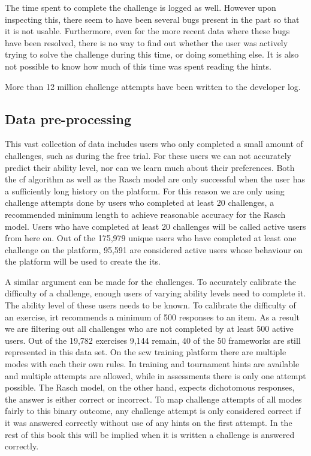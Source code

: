 The time spent to complete the challenge is logged as well.
However upon inspecting this, there seem to have been several bugs present in the past so that it is not usable.
Furthermore, even for the more recent data where these bugs have been resolved, there is no way to find out whether the user was actively trying to solve the challenge during this time, or doing something else.
It is also not possible to know how much of this time was spent reading the hints.

More than 12 million challenge attempts have been written to the developer log.

\subsection{Data pre-processing}
This vast collection of data includes users who only completed a small amount of challenges, such as during the free trial.
For these users we can not accurately predict their ability level, nor can we learn much about their preferences.
Both the \gls{cf} algorithm as well as the Rasch model are only successful when the user has a sufficiently long history on the platform.
For this reason we are only using challenge attempts done by users who completed at least 20 challenges, a recommended minimum length to achieve reasonable accuracy for the Rasch model.
Users who have completed at least 20 challenges will be called active users from here on.
Out of the 175,979 unique users who have completed at least one challenge on the platform, 95,591 are considered active users whose behaviour on the platform will be used to create the \gls{its}.

A similar argument can be made for the challenges.
To accurately calibrate the difficulty of a challenge, enough users of varying ability levels need to complete it.
The ability level of these users needs to be known.
To calibrate the difficulty of an exercise, \gls{irt} recommends a minimum of 500 responses to an item.
As a result we are filtering out all challenges who are not completed by at least 500 active users.
Out of the 19,782 exercises 9,144 remain, 40 of the 50 frameworks are still represented in this data set.
On the \gls{scw} training platform there are multiple modes with each their own rules.
In training and tournament hints are available and multiple attempts are allowed, while in assessments there is only one attempt possible.
The Rasch model, on the other hand, expects dichotomous responses, the answer is either correct or incorrect.
To map challenge attempts of all modes fairly to this binary outcome, any challenge attempt is only considered correct if it was answered correctly without use of any hints on the first attempt.
In the rest of this book this will be implied when it is written a challenge is answered correctly.

